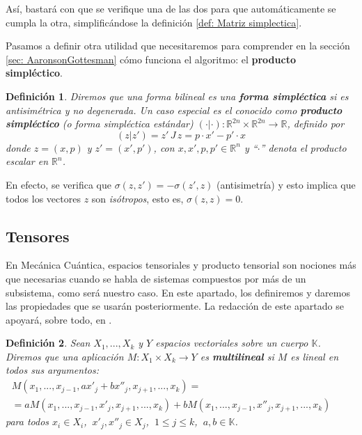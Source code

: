 \documentclass[11pt,a4paper,twoside,pdf]{article}
\numberwithin{equation}{section}
\newtheorem{definition}{Definición}
\begin{document}
		\noindent Así, bastará con que se verifique una de las dos para que automáticamente se cumpla la otra, simplificándose la definición \ref{def: Matriz simplectica}.

		Pasamos a definir otra utilidad que necesitaremos para comprender en la sección \ref{sec: AaronsonGottesman} cómo funciona el algoritmo: el \textbf{producto simpléctico}.
		
			\begin{definition} \label{def: producto simplectico}
				Diremos que una forma bilineal es una \textbf{forma simpléctica} si es antisimétrica y no degenerada. Un caso especial es el conocido como \textbf{producto simpléctico} (o forma simpléctica estándar) $(\cdot | \cdot)  : \mathbb{R}^{2n} \times \mathbb{R}^{2n} \longrightarrow \mathbb{R}$, definido por
					\begin{equation} \label{eq: producto simplectico}
						 (z|z') = z'\, J\, z = p\cdot x' - p'\cdot x
					\end{equation}
				donde $z=(x,p)$ y $z'=(x',p')$, con $x, x', p, p' \in \mathbb{R}^n$	 y ``$ \cdot$'' denota el producto escalar en $\mathbb{R}^n$.
			\end{definition}	

		En efecto, se verifica que $\sigma(z,z')=-\sigma(z',z)$ (antisimetría) y esto implica que todos los vectores $z$ son \textit{isótropos}, esto es, $\sigma(z,z)=0$.
		
	\subsection{Tensores} \label{subsec: tensores}
	
	En Mecánica Cuántica, espacios tensoriales y producto tensorial son nociones más que necesarias cuando se habla de sistemas compuestos por más de un subsistema, como será nuestro caso. En este apartado, los definiremos y daremos las propiedades que se usarán posteriormente. La redacción de este apartado se apoyará, sobre todo, en \cite{AlgebraII}.
	
	\begin{definition}
		Sean $X_1,...,X_k$ y $Y$ espacios vectoriales sobre un cuerpo $\mathbb{K}$. Diremos que una aplicación $M: X_1 \times X_k \rightarrow Y$ es \textbf{multilineal} si $M$ es lineal en todos sus argumentos:
			\begin{multline}
				M(x_1,...,x_{j-1}, ax'_j + b x''_j , x_{j+1}, ... , x_k) = \\
				= a M (x_1,...,x_{j-1}, x'_j, x_{j+1}, ... , x_k) + b M(x_1,...,x_{j-1},  x''_j , x_{j+1}, ... , x_k) \qquad
			\end{multline}
		para todos $x_i\in X_i$, $\: x'_j,x''_j\in X_j$, $\:1\leq j \leq k$, $\:a,b\in \mathbb{K}$.	
	\end{definition}
	
\end{document}
